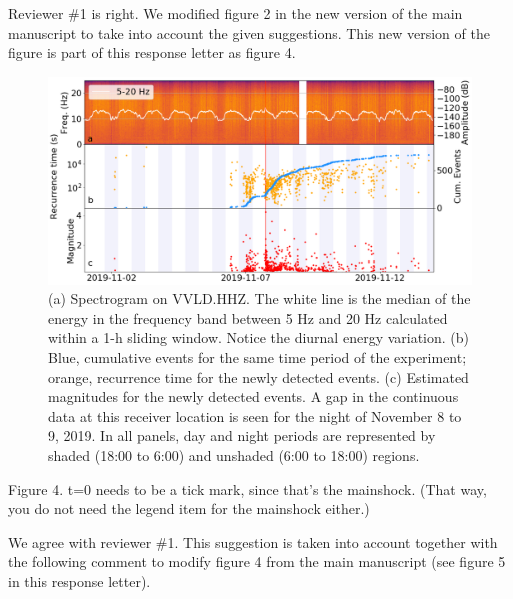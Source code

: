 \documentclass[10pt]{extarticle}
\begin{document}
\begin{Answer}
Reviewer \#1 is right. We modified figure 2 in the new version of the main manuscript to take into account the given suggestions. This new version of the figure is part of this response letter as figure 4.
 \WorkInProgressRevTask
\begin{figure}[!h]
\begin{center}
 \includegraphics[width=1\linewidth]{spec_rec_mag.png} 
 \caption{(a) Spectrogram on VVLD.HHZ. The white line is the median of the energy in the frequency band between 5 Hz and 20 Hz calculated within a 1-h sliding window. Notice the diurnal energy variation. (b) Blue, cumulative events for the same time period of the experiment; orange, recurrence time for the newly detected events. (c) Estimated magnitudes for the newly detected events. A gap in the continuous data at this receiver location is seen for the night of November 8 to 9, 2019. In all panels, day and night periods are represented by shaded (18:00 to 6:00) and unshaded (6:00 to 18:00) regions.}
\end{center}
\label{fig:new_fig_2}
\end{figure}
\end{Answer}
%
%


\begin{ReviewerComment}{1}
\noindent 
Figure 4. t=0 needs to be a tick mark, since that's the mainshock. (That way, you do not need the legend item for the mainshock either.)
\end{ReviewerComment}


\begin{Answer}
 \WorkInProgressRevTask
We agree with reviewer \#1. This suggestion is taken into account together with the following comment to modify figure 4 from the main manuscript (see figure 5 in this response letter).
\end{Answer}
%
%
\end{document}
